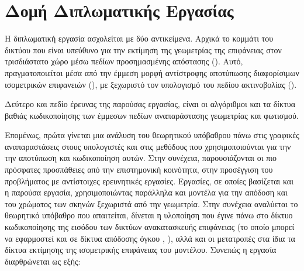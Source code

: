 \section{Δομή Διπλωματικής Εργασίας}
\label{section:Layout}
\par 
    Η διπλωματική εργασία ασχολείται με δύο αντικείμενα. Αρχικά το κομμάτι του δικτύου που είναι υπεύθυνο για την εκτίμηση της γεωμετρίας της επιφάνειας στον τρισδιάστατο χώρο μέσω πεδίων προσημασμένης απόστασης (). Αυτό, πραγματοποιείται μέσα  από την έμμεση μορφή αντίστροφης αποτύπωσης διαφορίσιμων ισομετρικών επιφανειών (), με ξεχωριστό τον υπολογισμό του πεδίου ακτινοβολίας (). 
\par 
    Δεύτερο και πεδίο έρευνας της παρούσας εργασίας, είναι οι αλγόριθμοι και τα δίκτυα βαθιάς
    κωδικοποίησης των έμμεσων πεδίων αναπαράστασης γεωμετρίας και φωτισμού.
\par    
    Επομένως, πρώτα γίνεται μια ανάλυση του θεωρητικού υπόβαθρου πάνω στις γραφικές αναπαραστάσεις στους υπολογιστές και στις μεθόδους που χρησιμοποιούνται για την την αποτύπωση και κωδικοποίηση αυτών. Στην συνέχεια, παρουσιάζονται οι πιο πρόσφατες προσπάθειες από την επιστημονική κοινότητα, στην προσέγγιση του προβλήματος με αντίστοιχες ερευνητικές εργασίες. Εργασίες, σε οποίες βασίζεται και η παρούσα εργασία, χρησιμοποιώντας παράλληλα και μοντέλα για την απόδοση και του χρώματος των σκηνών ξεχωριστά από την γεωμετρία. Στην συνέχεια αναλύεται το θεωρητικό υπόβαθρο που απαιτείται, δίνεται η υλοποίηση που έγινε πάνω στο δίκτυο κωδικοποίησης της εισόδου των δικτύων ανακατασκευής επιφάνειας (το οποίο μπορεί να εφαρμοστεί και σε δίκτυα απόδοσης όγκου \cite{mildenhall2020nerf}, \cite{DBLP:journals/corr/abs-2106-10689}), αλλά και οι μετατροπές στα ίδια τα δίκτυα εκτίμησης της ισομετρικής επιφάνειας του  μοντέλου. Συνεπώς η εργασία διαρθρώνεται ως εξής:
